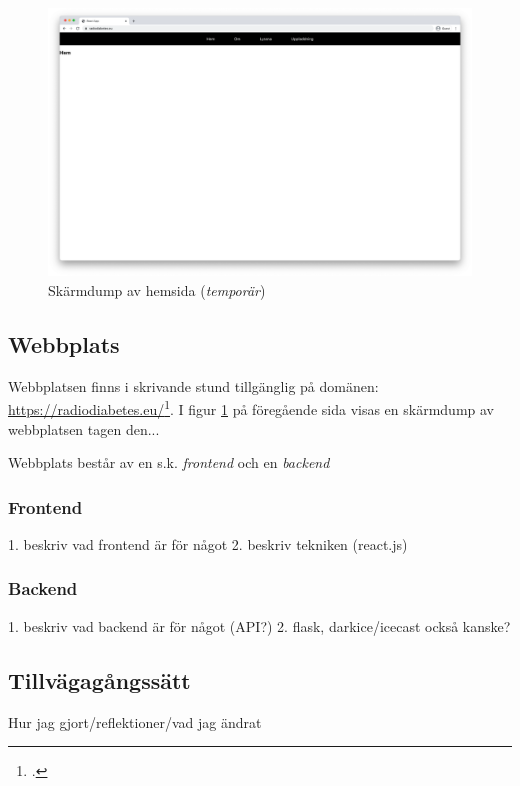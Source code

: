 \documentclass[11pt, a4paper]{article} %
\begin{document}
\begin{figure}[ht!]
\centering
\includegraphics[width=\textwidth]{../media/hemsida.png}
\caption{Skärmdump av hemsida (\emph{temporär})}
\label{hemsida}
\end{figure}

\subsection*{Webbplats}

\nolinebreak Webbplatsen finns i skrivande stund tillgänglig på domänen: \url{https://radiodiabetes.eu/}\footcite{jondell_radio_nodate}. I figur \ref{hemsida} på föregående sida visas en skärmdump av webbplatsen tagen den... \nolinebreak %

Webbplats består av en s.k. \emph{frontend} och en \emph{backend}
\subsubsection*{Frontend}
1. beskriv vad frontend är för något
2. beskriv tekniken (react.js)

\subsubsection*{Backend}
1. beskriv vad backend är för något (API?)
2. flask, darkice/icecast också kanske? 

\subsection*{Tillvägagångssätt}
Hur jag gjort/reflektioner/vad jag ändrat
\end{document}
